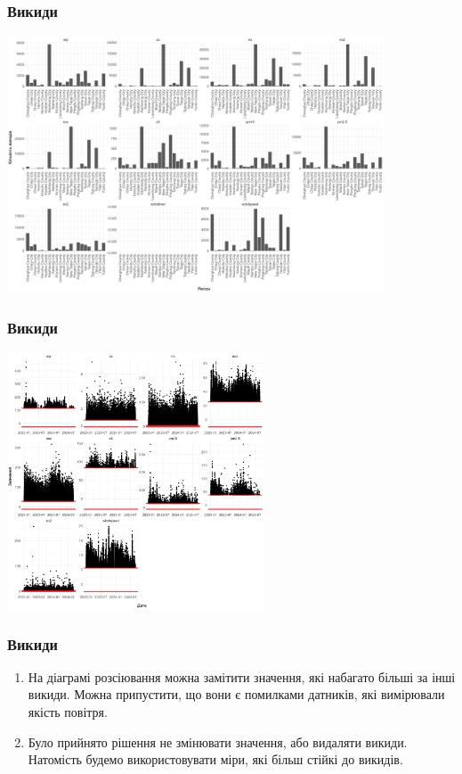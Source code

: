 \documentclass{beamer}
\begin{document}
\begin{frame}
  \frametitle{Викиди}

  \begin{center}
    \includegraphics[height=3in]{plots/outliers/count-bar-county.png}
  \end{center}
\end{frame}

\begin{frame}
  \frametitle{Викиди}

  \begin{center}
    \includegraphics[height=3in]{plots/outliers/scatter.png}
  \end{center}
\end{frame}

\begin{frame}
  \frametitle{Викиди}

  \begin{enumerate}
    \item На діаграмі розсіювання можна замітити значення, які набагато більші за
    інші викиди. Можна припустити, що вони є помилками датників, які вимірювали якість
    повітря.
    \item  Було прийнято рішення не змінювати значення, або видаляти викиди.
    Натомість будемо використовувати міри, які більш стійкі до викидів.
  \end{enumerate}
\end{frame}
\end{document}
